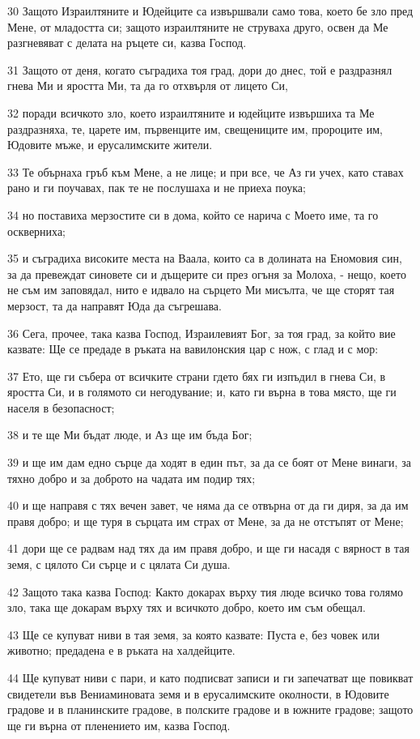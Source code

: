 \par 30 Защото Израилтяните и Юдейците са извършвали само това, което бе зло пред Мене, от младостта си; защото израилтяните не струваха друго, освен да Ме разгневяват с делата на ръцете си, казва Господ.
\par 31 Защото от деня, когато съградиха тоя град, дори до днес, той е раздразнял гнева Ми и яростта Ми, та да го отхвърля от лицето Си,
\par 32 поради всичкото зло, което израилтяните и юдейците извършиха та Ме раздразняха, те, царете им, първенците им, свещениците им, пророците им, Юдовите мъже, и ерусалимските жители.
\par 33 Те обърнаха гръб към Мене, а не лице; и при все, че Аз ги учех, като ставах рано и ги поучавах, пак те не послушаха и не приеха поука;
\par 34 но поставиха мерзостите си в дома, който се нарича с Моето име, та го оскверниха;
\par 35 и съградиха високите места на Ваала, които са в долината на Еномовия син, за да превеждат синовете си и дъщерите си през огъня за Молоха, - нещо, което не съм им заповядал, нито е идвало на сърцето Ми мисълта, че ще сторят тая мерзост, та да направят Юда да съгрешава.
\par 36 Сега, прочее, така казва Господ, Израилевият Бог, за тоя град, за който вие казвате: Ще се предаде в ръката на вавилонския цар с нож, с глад и с мор:
\par 37 Ето, ще ги събера от всичките страни гдето бях ги изпъдил в гнева Си, в яростта Си, и в голямото си негодувание; и, като ги върна в това място, ще ги населя в безопасност;
\par 38 и те ще Ми бъдат люде, и Аз ще им бъда Бог;
\par 39 и ще им дам едно сърце да ходят в един път, за да се боят от Мене винаги, за тяхно добро и за доброто на чадата им подир тях;
\par 40 и ще направя с тях вечен завет, че няма да се отвърна от да ги диря, за да им правя добро; и ще туря в сърцата им страх от Мене, за да не отстъпят от Мене;
\par 41 дори ще се радвам над тях да им правя добро, и ще ги насадя с вярност в тая земя, с цялото Си сърце и с цялата Си душа.
\par 42 Защото така казва Господ: Както докарах върху тия люде всичко това голямо зло, така ще докарам върху тях и всичкото добро, което им съм обещал.
\par 43 Ще се купуват ниви в тая земя, за която казвате: Пуста е, без човек или животно; предадена е в ръката на халдейците.
\par 44 Ще купуват ниви с пари, и като подписват записи и ги запечатват ще повикват свидетели във Вениаминовата земя и в ерусалимските околности, в Юдовите градове и в планинските градове, в полските градове и в южните градове; защото ще ги върна от пленението им, казва Господ.

